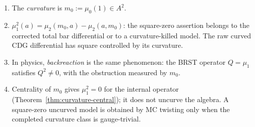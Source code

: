 \begin{remark}\label{rem:curvature-backreaction-terminology}
\begin{enumerate}[label=(\roman*)]
\item The \emph{curvature} is $m_0 := \mu_0(1) \in A^2$.
\item $\mu_1^2(a) = \mu_2(m_0, a) - \mu_2(a, m_0)$: the
 square-zero assertion belongs to the corrected total bar
 differential or to a curvature-killed model. The raw curved
 CDG differential has square controlled by its curvature.
\item In physics, \emph{backreaction} is the same phenomenon: the BRST operator $Q = \mu_1$ satisfies $Q^2 \neq 0$, with the obstruction measured by $m_0$.
\item Centrality of $m_0$ gives $\mu_1^2=0$ for the internal operator
 (Theorem~\ref{thm:curvature-central}); it does not uncurve the
 algebra. A square-zero uncurved model is obtained by MC twisting only
 when the completed curvature class is gauge-trivial.
\end{enumerate}
\end{remark}

